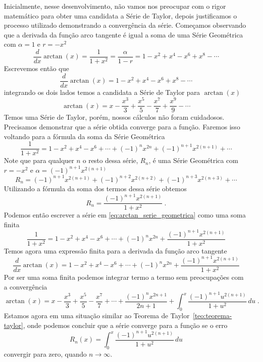 Inicialmente, nesse desenvolvimento, não vamos nos preocupar com o
rigor matemático para obter uma candidata a Série de Taylor,
depois justificamos o processo utilizado demonstrando a
convergência da série.
Começamos observando que a derivada da função arco tangente
é igual a soma de uma Série Geométrica com $\alpha=1$ e $r=-x^2$
\[
  \frac{d}{dx} \arctan(x)
  = \frac{1}{1+x^2}
  = \frac{\alpha}{1-r}
  = 1 - x^2 + x^4 - x^6 + x^8 - \cdots
\]
Escrevemos então que
\[
  \frac{d}{dx} \arctan(x) =  1 - x^2 + x^4 - x^6 + x^8 - \cdots
\]
integrando os dois lados temos a candidata a Série de Taylor para $\arctan(x)$
\[
  \arctan(x) = x -\frac{x^3}{3} + \frac{x^5}{5} - \frac{x^7}{7} + \frac{x^9}{9} - \cdots
\]
Temos uma Série de Taylor, porém, nossos cálculos não foram cuidadosos.
Precisamos demonstrar que a série obtida converge para a função.
Faremos isso voltando para a fórmula da soma da Série Geométrica
\begin{equation}
  \label{eq:arctan_serie_geometrica}
  \frac{1}{1+x^2}
    = 1 - x^2 + x^4 - x^6 + \cdots
    + (-1)^n x^{2n}
    + (-1)^{n+1} x^{2(n+1)} + \cdots
\end{equation}
Note que para qualquer $n$ o resto dessa série, $R_n$,
é uma Série Geométrica com $r=-x^2$ e $\alpha=(-1)^{n+1} x^{2(n+1)}$
\[
  R_n =
  (-1)^{n+1} x^{2(n+1)} +
  (-1)^{n+2} x^{2(n+2)} +
  (-1)^{n+3} x^{2(n+3)} + \cdots
\]
Utilizando a fórmula da soma dos termos dessa série obtemos
\[
  R_n = \frac{(-1)^{n+1} x^{2(n+1)}}{1+x^2}    \;.
\]
Podemos então escrever a série em \eqref{eq:arctan_serie_geometrica}
como uma soma finita
\[
  \frac{1}{1+x^2}
    = 1 - x^2 + x^4 - x^6 + \cdots
    + (-1)^n x^{2n}
    + \frac{(-1)^{n+1} x^{2(n+1)}}{1+x^2}
\]
Temos agora uma expressão finita para a derivada da função arco tangente
\[
  \frac{d}{dx} \arctan(x)
    = 1 - x^2 + x^4 - x^6
    + \cdots
    + (-1)^n x^{2n}
    + \frac{(-1)^{n+1} x^{2(n+1)}}{1+x^2}
\]
Por ser uma soma finita podemos integrar termo a termo
sem preocupações com a convergência
\[
  \arctan(x) =
    x - \frac{x^3}{3}
    + \frac{x^5}{5}
    - \frac{x^7}{7}
    + \cdots
    + \frac{(-1)^n x^{2n+1}}{2n+1}
    + \int_0^x \frac{(-1)^{n+1} u^{2(n+1)}}{1+u^2} \,du   \;.
\]
Estamos agora em uma situação similar ao Teorema de Taylor~\ref{teo:teorema-taylor},
onde podemos concluir que a série converge para a função se o erro
\[
  R_n(x) = \int_0^x \frac{(-1)^{n+1} u^{2(n+1)}}{1+u^2} \,du
\]
convergir para zero, quando $n\to\infty$.

